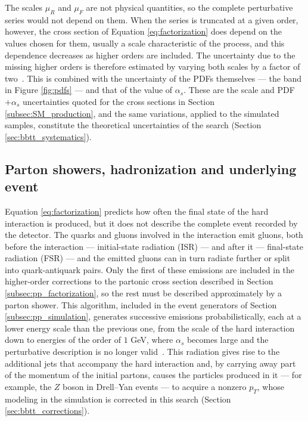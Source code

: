The scales $\mu_R$ and $\mu_F$ are not physical quantities, so the complete perturbative series would not depend on them. When the series is truncated at a given order, however, the cross section of Equation \ref{eq:factorization} does depend on the values chosen for them, usually a scale characteristic of the process, and this dependence decreases as higher orders are included. The uncertainty due to the missing higher orders is therefore estimated by varying both scales by a factor of two~\cite{deFlorian:2016spz}. This is combined with the uncertainty of the PDFs themselves — the band in Figure \ref{fig:pdfs} — and that of the value of $\alpha_s$. These are the scale and PDF$+\alpha_s$ uncertainties quoted for the cross sections in Section \ref{subsec:SM_production}, and the same variations, applied to the simulated samples, constitute the theoretical uncertainties of the search (Section \ref{sec:bbtt_systematics}).



\subsection{Parton showers, hadronization and underlying event}
\label{subsec:pp_event}
%
Equation \ref{eq:factorization} predicts how often the final state of the hard interaction is produced, but it does not describe the complete event recorded by the detector. The quarks and gluons involved in the interaction emit gluons, both before the interaction — initial-state radiation (ISR) — and after it — final-state radiation (FSR) — and the emitted gluons can in turn radiate further or split into quark-antiquark pairs. Only the first of these emissions are included in the higher-order corrections to the partonic cross section described in Section \ref{subsec:pp_factorization}, so the rest must be described approximately by a parton shower. This algorithm, included in the event generators of Section \ref{subsec:pp_simulation}, generates successive emissions probabilistically, each at a lower energy scale than the previous one, from the scale of the hard interaction down to energies of the order of $1$ GeV, where $\alpha_s$ becomes large and the perturbative description is no longer valid~\cite{Buckley:2011ms}. This radiation gives rise to the additional jets that accompany the hard interaction and, by carrying away part of the momentum of the initial partons, causes the particles produced in it — for example, the $Z$ boson in Drell–Yan events — to acquire a nonzero $p_T$, whose modeling in the simulation is corrected in this search (Section \ref{sec:bbtt_corrections}).



